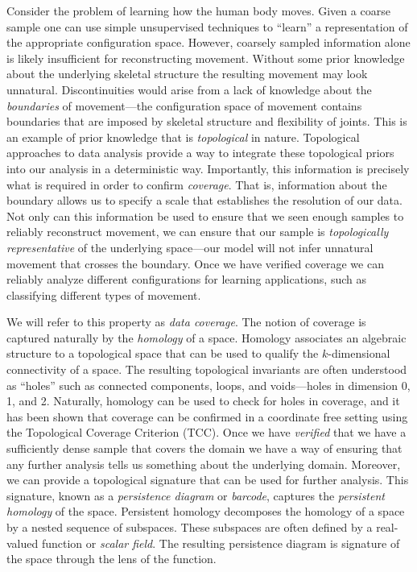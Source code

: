 Consider the problem of learning how the human body moves.
Given a coarse sample one can use simple unsupervised techniques to ``learn'' a representation of the appropriate configuration space.
However, coarsely sampled information alone is likely insufficient for reconstructing movement.
Without some prior knowledge about the underlying skeletal structure the resulting movement may look unnatural.
Discontinuities would arise from a lack of knowledge about the \emph{boundaries} of movement---the configuration space of movement contains boundaries that are imposed by skeletal structure and flexibility of joints.
This is an example of prior knowledge that is \emph{topological} in nature.
Topological approaches to data analysis provide a way to integrate these topological priors into our analysis in a deterministic way.
Importantly, this information is precisely what is required in order to confirm \emph{coverage}.
That is, information about the boundary allows us to specify a scale that establishes the resolution of our data.
Not only can this information be used to ensure that we seen enough samples to reliably reconstruct movement, we can ensure that our sample is \emph{topologically representative} of the underlying space---our model will not infer unnatural movement that crosses the boundary.
Once we have verified coverage we can reliably analyze different configurations for learning applications, such as classifying different types of movement.

We will refer to this property as \emph{data coverage}.
The notion of coverage is captured naturally by the \emph{homology} of a space.
Homology associates an algebraic structure to a topological space that can be used to qualify the $k$-dimensional connectivity of a space.
The resulting topological invariants are often understood as ``holes'' such as connected components, loops, and voids---holes in dimension 0, 1, and 2.
Naturally, homology can be used to check for holes in coverage, and it has been shown that coverage can be confirmed in a coordinate free setting using the Topological Coverage Criterion (TCC).
Once we have \emph{verified} that we have a sufficiently dense sample that covers the domain we have a way of ensuring that any further analysis tells us something about the underlying domain.
Moreover, we can provide a topological signature that can be used for further analysis.
This signature, known as a \emph{persistence diagram} or \emph{barcode}, captures the \emph{persistent homology} of the space.
Persistent homology decomposes the homology of a space by a nested sequence of subspaces.
These subspaces are often defined by a real-valued function or \emph{scalar field}.
The resulting persistence diagram is signature of the space through the lens of the function.

